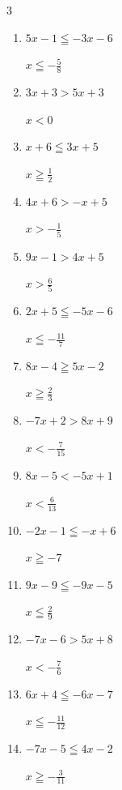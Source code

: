 \begin{multicols}{3}
\begin{enumerate}
  \item $5x-1\leqq -3x-6$

        $\displaystyle x\leqq -\frac{5}{8}$

  \item $3x+3>5x+3$

        $\displaystyle x<0$

  \item $x+6\leqq 3x+5$

        $\displaystyle x\geqq \frac{1}{2}$

  \item $4x+6>-x+5$

        $\displaystyle x>-\frac{1}{5}$

  \item $9x-1>4x+5$

        $\displaystyle x>\frac{6}{5}$

  \item $2x+5\leqq -5x-6$

        $\displaystyle x\leqq -\frac{11}{7}$

\columnbreak %

  \item $8x-4\geqq 5x-2$

        $\displaystyle x\geqq \frac{2}{3}$

  \item $-7x+2>8x+9$

        $\displaystyle x<-\frac{7}{15}$

  \item $8x-5<-5x+1$

        $\displaystyle x<\frac{6}{13}$

  \item $-2x-1\leqq -x+6$

        $\displaystyle x\geqq -7$

  \item $9x-9\leqq -9x-5$

        $\displaystyle x\leqq \frac{2}{9}$

  \item $-7x-6>5x+8$

        $\displaystyle x<-\frac{7}{6}$

  \item $6x+4\leqq -6x-7$

        $\displaystyle x\leqq -\frac{11}{12}$

  \item $-7x-5\leqq 4x-2$

        $\displaystyle x\geqq -\frac{3}{11}$


\end{enumerate}
\end{multicols}
